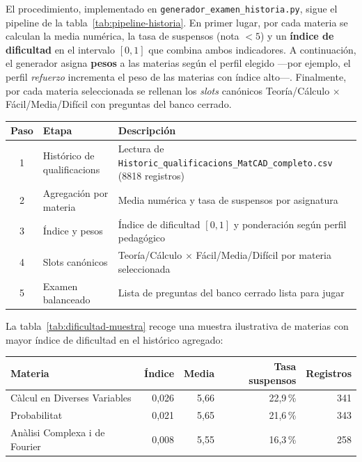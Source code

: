 \documentclass[11pt,a4paper]{article}
\newcommand{\iniciotabla}{\par\medskip\renewcommand{\arraystretch}{1.12}}
\newcommand{\fintabla}{\par\medskip}
\begin{document}
El procedimiento, implementado en \texttt{generador\_examen\_historia.py}, sigue el pipeline de la tabla~\ref{tab:pipeline-historia}. En primer lugar, por cada materia se calculan la media numérica, la tasa de suspensos (nota $< 5$) y un \textbf{índice de dificultad} en el intervalo $[0,1]$ que combina ambos indicadores. A continuación, el generador asigna \textbf{pesos} a las materias según el perfil elegido ---por ejemplo, el perfil \textit{refuerzo} incrementa el peso de las materias con índice alto---. Finalmente, por cada materia seleccionada se rellenan los \textit{slots} canónicos Teoría/Cálculo $\times$ Fácil/Media/Difícil con preguntas del banco cerrado.

\iniciotabla
\begin{tabular}{@{}clp{7.8cm}@{}}
\toprule
\textbf{Paso} & \textbf{Etapa} & \textbf{Descripción} \\
\midrule
1 & Histórico de qualificacions & Lectura de \texttt{Historic\_qualificacions\_MatCAD\_completo.csv} (8818 registros) \\
2 & Agregación por materia & Media numérica y tasa de suspensos por asignatura \\
3 & Índice y pesos & Índice de dificultad $[0,1]$ y ponderación según perfil pedagógico \\
4 & Slots canónicos & Teoría/Cálculo $\times$ Fácil/Media/Difícil por materia seleccionada \\
5 & Examen balanceado & Lista de preguntas del banco cerrado lista para jugar \\
\bottomrule
\end{tabular}
\label{tab:pipeline-historia}
\fintabla

La tabla~\ref{tab:dificultad-muestra} recoge una muestra ilustrativa de materias con mayor índice de dificultad en el histórico agregado:

\iniciotabla
\begin{tabular}{@{}lrrrr@{}}
\toprule
\textbf{Materia} & \textbf{Índice} & \textbf{Media} & \textbf{Tasa suspensos} & \textbf{Registros} \\
\midrule
Càlcul en Diverses Variables & 0,026 & 5,66 & 22,9\,\% & 341 \\
Probabilitat & 0,021 & 5,65 & 21,6\,\% & 343 \\
Anàlisi Complexa i de Fourier & 0,008 & 5,55 & 16,3\,\% & 258 \\
\bottomrule
\end{tabular}
\label{tab:dificultad-muestra}
\fintabla
\end{document}
